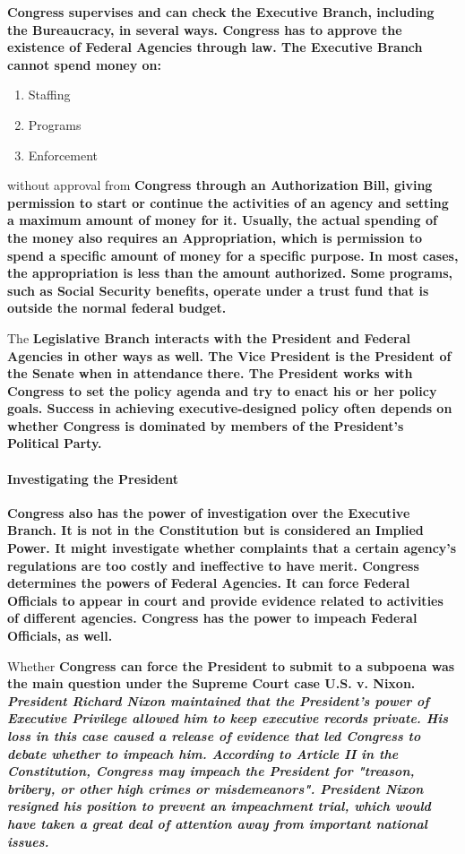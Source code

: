 \bf{Congress} supervises and can check the \bf{Executive Branch}, including the
\bf{Bureaucracy}, in several ways. \bf{Congress} has to approve the existence of
\bf{Federal Agencies} through law. The \bf{Executive Branch} cannot spend money
on:

\begin{enumerate}
    \item Staffing
    \item Programs
    \item Enforcement
\end{enumerate}

without approval from \bf{Congress} through an \bf{Authorization Bill}, giving
permission to start or continue the activities of an agency and setting a
maximum amount of money for it. Usually, the actual spending of the money also
requires an \bf{Appropriation}, which is permission to spend a specific amount
of money for a specific purpose. In most cases, the appropriation is less than
the amount authorized. Some programs, such as \bf{Social Security} benefits,
operate under a trust fund that is outside the normal federal budget.

The \bf{Legislative Branch} interacts with the \bf{President} and \bf{Federal
Agencies} in other ways as well. The \bf{Vice President} is the \bf{President}
of the \bf{Senate} when in attendance there. The \bf{President} works with
\bf{Congress} to set the policy agenda and try to enact his or her policy goals.
Success in achieving executive-designed policy often depends on whether
\bf{Congress} is dominated by members of the \bf{President's Political Party}.

\paragraph{Investigating the President}

\bf{Congress} also has the power of investigation over the \bf{Executive
Branch}. It is not in the \bf{Constitution} but is considered an \bf{Implied
Power}. It might investigate whether complaints that a certain agency's
regulations are too costly and ineffective to have merit. \bf{Congress}
determines the powers of \bf{Federal Agencies}. It can force \bf{Federal
Officials} to appear in court and provide evidence related to activities of
different agencies. \bf{Congress} has the power to impeach \bf{Federal
Officials}, as well.

Whether \bf{Congress} can force the \bf{President} to submit to a subpoena was
the main question under the \bf{Supreme Court} case U.S. v. Nixon. \it{President
Richard Nixon} maintained that the \bf{President's} power of \bf{Executive
Privilege} allowed him to keep executive records private. His loss in this case
caused a release of evidence that led \bf{Congress} to debate whether to impeach
him. According to \it{Article II} in the \bf{Constitution}, \bf{Congress} may
impeach the \bf{President} for \it{"treason, bribery, or other high crimes or
misdemeanors"}. \bf{President Nixon} resigned his position to prevent an
impeachment trial, which would have taken a great deal of attention away from
important national issues.

